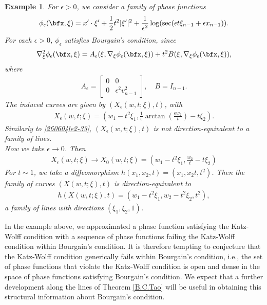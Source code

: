 \documentclass{article}
\numberwithin{equation}{section}
\theoremstyle{plain}
\newtheorem{example}[theorem]{Example}
\begin{document}
\begin{example}
    For $\epsilon>0$, we consider a family of phase functions
    \begin{align}
        \phi_\epsilon(\bfx,\xi)=x'\cdot\xi'+\frac12 t^2|\xi'|^2+ \frac{1}{\epsilon^2}\log(\sec (\epsilon t\xi_{n-1}+ \epsilon x_{n-1})).
    \end{align}
    For each $\epsilon>0$, $\phi_\epsilon$ satisfies Bourgain's condition, since
    \begin{align}
        \nabla_\xi^2\phi_\epsilon(\bfx,\xi)= A_\epsilon(\xi,\nabla_\xi\phi_{\epsilon}(\bfx,\xi))+ t^2 B(\xi,\nabla_\xi\phi_{\epsilon}(\bfx,\xi)),
    \end{align}
    where 
    \begin{align}
    A_\epsilon=\begin{bmatrix}
        0 & 0\\
        0 & \epsilon^2 v_{n-1}^2
    \end{bmatrix},\quad
    B= I_{n-1}.
\end{align}
The induced curves are given by $(X_\epsilon(w,t;\xi),t)$, with
\begin{align}
    X_\epsilon(w,t;\xi)= \left(w_1-t^2\xi_1,\frac{1}{\epsilon}\arctan\left(\frac{\epsilon w_2}{t}\right)-t\xi_2\right).
\end{align}
Similarly to \eqref{260604le2-33}, $(X_\epsilon(w,t;\xi),t)$ is not direction-equivalent to a family of lines.\\

Now we take $\epsilon\to 0$. Then
\begin{align}
    X_\epsilon(w,t;\xi)\to X_0(w,t;\xi)= \left(w_1-t^2\xi_1,\frac{ w_2}{t}-t\xi_2\right)
\end{align}
For $t\sim 1$, we take a diffeomorphism $h(x_1,x_2,t)= (x_1,x_2 t,t^2)$. Then the family of curves $(X(w,t;\xi),t)$ is direction-equivalent to 
\begin{align}
    h(X(w,t;\xi),t)= (w_1-t^2\xi_1,w_2-t^2\xi_2,t^2),
\end{align}
a family of lines with directions $(\xi_1,\xi_2,1)$.
\end{example}


In the example above, we approximated a phase function satisfying the Katz-Wolff condition with a sequence of phase functions failing the Katz-Wolff condition within Bourgain's condition. It is therefore tempting to conjecture that the Katz‑Wolff condition generically fails within Bourgain's condition, i.e., the set of phase functions that violate the Katz‑Wolff condition is open and dense in the space of phase functions satisfying Bourgain's condition. We expect that a further development along the lines of Theorem \ref{B.C.Tao} will be useful in obtaining this structural information about Bourgain's condition. 
\end{document}
